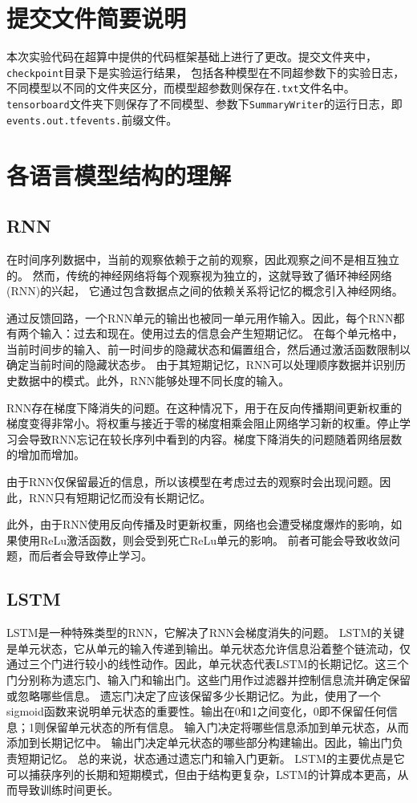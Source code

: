 \documentclass[]{ctexart}
\begin{document}
\section{提交文件简要说明}
本次实验代码在超算中提供的代码框架基础上进行了更改。提交文件夹中，\texttt{checkpoint}目录下是实验运行结果，
包括各种模型在不同超参数下的实验日志，不同模型以不同的文件夹区分，而模型超参数则保存在\texttt{.txt}文件名中。
\texttt{tensorboard}文件夹下则保存了不同模型、参数下\texttt{SummaryWriter}的运行日志，即\texttt{events.out.tfevents.}前缀文件。
\section{各语言模型结构的理解}

\subsection{RNN}
在时间序列数据中，当前的观察依赖于之前的观察，因此观察之间不是相互独立的。
然而，传统的神经网络将每个观察视为独立的，这就导致了循环神经网络(RNN)的兴起，
它通过包含数据点之间的依赖关系将记忆的概念引入神经网络。

通过反馈回路，一个RNN单元的输出也被同一单元用作输入。因此，每个RNN都有两个输入：过去和现在。使用过去的信息会产生短期记忆。
在每个单元格中，当前时间步的输入、前一时间步的隐藏状态和偏置组合，然后通过激活函数限制以确定当前时间的隐藏状态步。
由于其短期记忆，RNN可以处理顺序数据并识别历史数据中的模式。此外，RNN能够处理不同长度的输入。

RNN存在梯度下降消失的问题。在这种情况下，用于在反向传播期间更新权重的梯度变得非常小。将权重与接近于零的梯度相乘会阻止网络学习新的权重。停止学习会导致RNN忘记在较长序列中看到的内容。梯度下降消失的问题随着网络层数的增加而增加。

由于RNN仅保留最近的信息，所以该模型在考虑过去的观察时会出现问题。因此，RNN只有短期记忆而没有长期记忆。

此外，由于RNN使用反向传播及时更新权重，网络也会遭受梯度爆炸的影响，如果使用ReLu激活函数，则会受到死亡ReLu单元的影响。
前者可能会导致收敛问题，而后者会导致停止学习。

\subsection{LSTM}
LSTM是一种特殊类型的RNN，它解决了RNN会梯度消失的问题。
LSTM的关键是单元状态，它从单元的输入传递到输出。单元状态允许信息沿着整个链流动，仅通过三个门进行较小的线性动作。因此，单元状态代表LSTM的长期记忆。这三个门分别称为遗忘门、输入门和输出门。这些门用作过滤器并控制信息流并确定保留或忽略哪些信息。
遗忘门决定了应该保留多少长期记忆。为此，使用了一个sigmoid函数来说明单元状态的重要性。输出在0和1之间变化，0即不保留任何信息；1则保留单元状态的所有信息。
输入门决定将哪些信息添加到单元状态，从而添加到长期记忆中。
输出门决定单元状态的哪些部分构建输出。因此，输出门负责短期记忆。
总的来说，状态通过遗忘门和输入门更新。
LSTM的主要优点是它可以捕获序列的长期和短期模式，但由于结构更复杂，LSTM的计算成本更高，从而导致训练时间更长。
\end{document}
